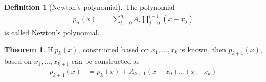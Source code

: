 \documentclass[fleqn, a4paper, 12pt, twoside]{article}
\theoremstyle{definition}
\newtheorem{definition}{Definition}
\theoremstyle{theorem}
\newtheorem{theorem}{Theorem}
\begin{document}
\begin{definition}[Newton's polynomial]
	The polynomial
	\begin{align*}
		p_n(x) & = \sum\limits_{i = 0}^{n} A_i \prod\limits_{j = 0}^{i - 1} (x - x_j)
	\end{align*}
	is called Newton's polynomial.
\end{definition}

\begin{theorem}
	If $p_k(x)$, constructed based on $x_1,\dots,x_k$ is known, then $p_{k + 1}(x)$, based on $x_1,\dots,x_{k + 1}$ can be constructed as
	\begin{align*}
		p_{k + 1}(x) & = p_k(x) + A_{k + 1} (x - x_0) \dots (x - x_k)
	\end{align*}
\end{theorem}
\end{document}

